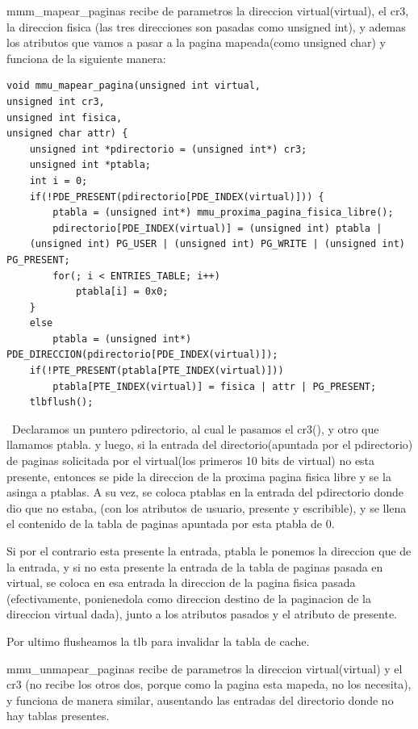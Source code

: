 \documentclass[a4paper]{article}
\newenvironment{codesnippet}{%
	\begin{Sbox}\begin{minipage}{\textwidth}\sffamily\small}%
	{\end{minipage}\end{Sbox}%
		\begin{center}%
		\vspace{-0.4cm}\colorbox{litegrey}{\TheSbox}\end{center}\vspace{0.3cm}}
\begin{document}
mmm_mapear_paginas recibe de parametros  la direccion virtual(virtual), el cr3, la direccion fisica (las tres direcciones son pasadas como unsigned int), y ademas los atributos que vamos a pasar a la pagina mapeada(como unsigned char) y funciona de la siguiente manera:



\begin{codesnippet}
\begin{verbatim}	
void mmu_mapear_pagina(unsigned int virtual,
unsigned int cr3,
unsigned int fisica, 
unsigned char attr) {
	unsigned int *pdirectorio = (unsigned int*) cr3;
	unsigned int *ptabla;
	int i = 0;
	if(!PDE_PRESENT(pdirectorio[PDE_INDEX(virtual)])) {
		ptabla = (unsigned int*) mmu_proxima_pagina_fisica_libre();
		pdirectorio[PDE_INDEX(virtual)] = (unsigned int) ptabla | 
	(unsigned int) PG_USER | (unsigned int) PG_WRITE | (unsigned int) PG_PRESENT;
		for(; i < ENTRIES_TABLE; i++)
			ptabla[i] = 0x0;
	} 
	else 
		ptabla = (unsigned int*) PDE_DIRECCION(pdirectorio[PDE_INDEX(virtual)]);
	if(!PTE_PRESENT(ptabla[PTE_INDEX(virtual)]))
		ptabla[PTE_INDEX(virtual)] = fisica | attr | PG_PRESENT;
	tlbflush();
\end{verbatim}
\end{codesnippet}
\
Declaramos un puntero pdirectorio, al cual le pasamos el cr3(), y otro que llamamos ptabla. y luego, si la entrada del directorio(apuntada por el pdirectorio) de paginas solicitada por el virtual(los primeros 10 bits de virtual) no esta presente, entonces se pide la direccion de la proxima pagina fisica libre y se la asinga a ptablas. A su vez, se coloca ptablas en la entrada del pdirectorio donde dio que no estaba, (con los atributos de usuario, presente y escribible), y se llena el contenido de la tabla de paginas apuntada por esta ptabla de 0.

Si por el contrario esta presente la entrada, ptabla le ponemos la direccion que de la entrada, y si no esta presente la entrada de la tabla de paginas pasada en virtual, se coloca en esa entrada la direccion de la pagina fisica pasada (efectivamente, ponienedola como direccion destino de la paginacion de la direccion virtual dada), junto a los atributos pasados y el atributo de presente.

Por ultimo flusheamos la tlb para invalidar la tabla de cache.

mmu_unmapear_paginas recibe de parametros  la direccion virtual(virtual) y el cr3 (no recibe los otros dos, porque como la pagina esta mapeda, no los necesita), y funciona de manera similar, ausentando las entradas del directorio  donde no hay tablas presentes.\\
\end{document}

